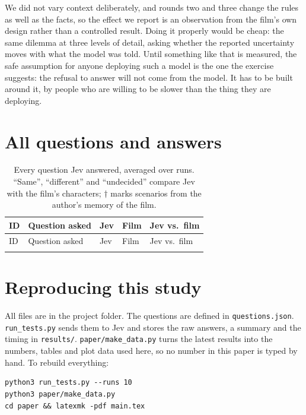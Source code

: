 \documentclass[journal]{IEEEtran}
\begin{document}
We did not vary context deliberately, and rounds two and three change the rules as well as the
facts, so the effect we report is an observation from the film's own design rather than a
controlled result. Doing it properly would be cheap: the same dilemma at three levels of detail,
asking whether the reported uncertainty moves with what the model was told. Until something like
that is measured, the safe assumption for anyone deploying such a model is the one the exercise
suggests: the refusal to answer will not come from the model. It has to be built around it, by
people who are willing to be slower than the thing they are deploying.

\printbibliography[heading=bibintoc,title={References}]

\clearpage
\onecolumn
\appendices
\section{All questions and answers}\label{app:results}

{\footnotesize
\setlength{\tabcolsep}{4pt}
\begin{longtable}{@{}>{\raggedright\arraybackslash}p{1.8cm}>{\raggedright\arraybackslash}p{7.4cm}>{\raggedright\arraybackslash}p{3.4cm}>{\raggedright\arraybackslash}p{2.4cm}>{\raggedright\arraybackslash}p{1.8cm}@{}}
\caption{Every question Jev answered, averaged over \NRuns{} runs. \enquote{Same}, \enquote{different} and \enquote{undecided} compare Jev with the film's characters; $\dagger$ marks scenarios from the author's memory of the film.}\label{tab:results}\\
\toprule
ID & Question asked & Jev & Film & Jev vs.\ film \\
\midrule
\endfirsthead
\toprule
ID & Question asked & Jev & Film & Jev vs.\ film \\
\midrule
\endhead
\bottomrule
\endfoot

\end{longtable}
}

\section{Reproducing this study}
All files are in the project folder. The questions are defined in \texttt{questions.json}. \texttt{run\_tests.py} sends them to Jev and stores the raw answers, a summary and the timing in \texttt{results/}. \texttt{paper/make\_data.py} turns the latest results into the numbers, tables and plot data used here, so no number in this paper is typed by hand. To rebuild everything:
\begin{verbatim}
python3 run_tests.py --runs 10
python3 paper/make_data.py
cd paper && latexmk -pdf main.tex
\end{verbatim}
\end{document}
